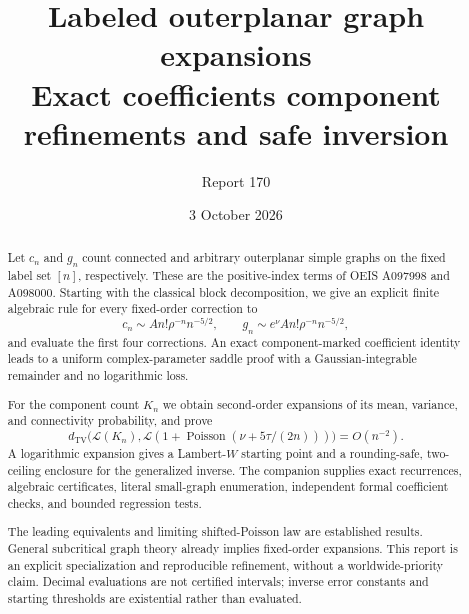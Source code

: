 \documentclass[11pt,letterpaper]{article}
\title{Labeled outerplanar graph expansions\\\large Exact coefficients component refinements and safe inversion}
\author{Report 170}
\date{3 October 2026}
\numberwithin{equation}{section}
\theoremstyle{remark}\newtheorem{remark}[theorem]{Remark}
\newcommand{\Pois}{\operatorname{Poisson}}
\newcommand{\TV}{d_{\mathrm{TV}}}
\begin{document}
\maketitle
\begin{abstract}
Let $c_n$ and $g_n$ count connected and arbitrary outerplanar simple
graphs on the fixed label set $[n]$, respectively. These are the
positive-index terms of OEIS A097998 and A098000. Starting with the
classical block decomposition, we give an explicit finite algebraic
rule for every fixed-order correction to
\[
 c_n\sim A n!\rho^{-n}n^{-5/2},\qquad
 g_n\sim e^\nu A n!\rho^{-n}n^{-5/2},
\]
and evaluate the first four corrections. An exact component-marked
coefficient identity leads to a uniform complex-parameter saddle proof
with a Gaussian-integrable remainder and no logarithmic loss.

For the component count $K_n$ we obtain second-order expansions of its
mean, variance, and connectivity probability, and prove
\[
 \TV\bigl(\mathcal L(K_n),\mathcal L(1+\Pois(\nu+5\tau/(2n)))\bigr)
 =O(n^{-2}).
\]
A logarithmic expansion gives a Lambert-$W$ starting point and a
rounding-safe, two-ceiling enclosure for the generalized inverse.
The companion supplies exact recurrences, algebraic certificates,
literal small-graph enumeration, independent formal coefficient
checks, and bounded regression tests.

The leading equivalents and limiting shifted-Poisson law are established
results. General subcritical graph theory already implies fixed-order
expansions. This report is an explicit specialization and reproducible
refinement, without a worldwide-priority claim. Decimal evaluations are
not certified intervals; inverse error constants and starting thresholds
are existential rather than evaluated.
\end{abstract}
\end{document}
